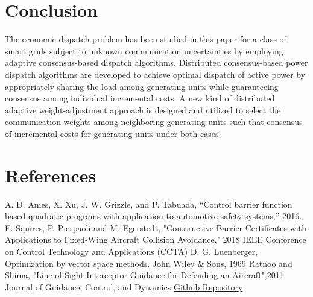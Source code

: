 \documentclass[11pt]{article}
\theoremstyle{definition}
\theoremstyle{remark}
\begin{document}
\section{Conclusion}\label{sec:8}
The economic dispatch problem has been studied in this paper for a class of smart grids subject to unknown communication uncertainties by employing adaptive consensus-based dispatch algorithms. Distributed consensus-based power dispatch algorithms are developed to achieve optimal dispatch of active power by appropriately sharing the load among generating units while guaranteeing consensus among individual incremental costs. A new kind of distributed adaptive weight-adjustment approach is designed and utilized to select the communication weights among neighboring generating units such that consensus of incremental costs for generating units under both cases.\\
\section{References}\label{sec:9}
\begin{thebibliography}{00}
A. D. Ames, X. Xu, J. W. Grizzle, and P. Tabuada, “Control barrier function based quadratic programs with application to automotive safety systems,” 2016.
E. Squires, P. Pierpaoli and M. Egerstedt, "Constructive Barrier Certificates with Applications to Fixed-Wing Aircraft Collision Avoidance," 2018 IEEE Conference on Control Technology and Applications (CCTA)
 D. G. Luenberger, Optimization by vector space methods. John Wiley & Sons, 1969
Ratnoo and Shima, "Line-of-Sight Interceptor Guidance for Defending an Aircraft",2011 Journal of Guidance, Control, and Dynamics
\href{https://github.com/dhruvshah0208/TAD}{Github Repository}

\end{thebibliography}

\vspace{12pt}
\color{red}
\end{document}
